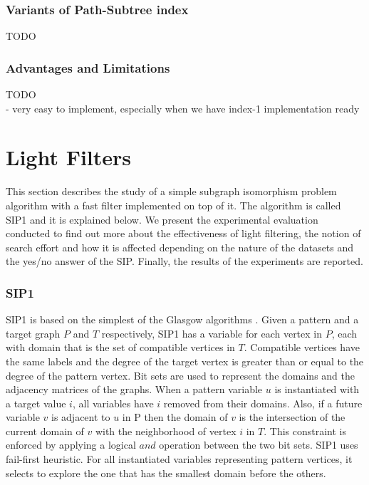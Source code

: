 \documentclass{l4proj}
\begin{document}
\subsection{Variants of Path-Subtree index}
TODO \\
\subsection{Advantages and Limitations}
TODO \\
 - very easy to implement, especially when we have index-1 implementation ready\\
 
 
 
 

\chapter{Light Filters}   
This section describes the study of a simple subgraph isomorphism problem algorithm with a fast filter implemented on top of it. The algorithm is called SIP1 and it is explained below. We present the experimental evaluation conducted to find out more about the effectiveness of light filtering, the notion of search effort and how it is affected depending on the nature of the datasets and the yes/no answer of the SIP. Finally, the results of the experiments are reported.

\subsection{SIP1}
SIP1 is based on the simplest of the Glasgow algorithms \cite{CP2015}. Given a pattern and a target graph $P$ and $T$ respectively, SIP1 has a variable for each vertex in $P$, each with domain that is the set of compatible vertices in $T$. Compatible vertices have the same labels and the degree of the target vertex is greater than or equal to the degree of the pattern vertex. Bit sets are used to represent the domains and the adjacency matrices of the graphs. When a pattern variable $u$ is instantiated with a target value $i$, all variables have $i$ removed from their domains. Also, if a future variable $v$ is adjacent to $u$ in P then the domain of $v$ is the intersection of the current domain of $v$ with the neighborhood of vertex $i$ in $T$. This constraint is enforced by applying a logical $and$ operation between the two bit sets. SIP1 uses fail-first heuristic. For all instantiated variables representing pattern vertices, it selects to explore the one that has the smallest domain before the others.
\end{document}
